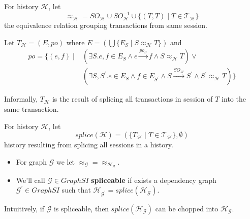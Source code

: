 \documentclass{beamer}
\begin{document}
\begin{frame}
	\begin{definition}
		For history $\mathcal{H}$, let
		$$ \approx_\mathcal{H} = SO_\mathcal{H} \cup SO^{-1}_\mathcal{H} \cup \{ (T,T) \mid T \in \mathcal{T}_\mathcal{H}\}$$
		the equivalence relation grouping transactions from same session.
	\end{definition}
\end{frame}

\begin{frame}
	\begin{definition}
		Let $\boxed{T}_\mathcal{H} = (E, po)$ where 
		$ E = \left(\bigcup \{E_S \mid S \approx_\mathcal{H} T \} \right) $
		and
		$$
		\begin{aligned}
			po = \{ (e,f) \mid & \left( \exists S . e,f \in E_S \wedge e \xrightarrow{po_S} f \wedge S \approx_\mathcal{H} T \right) \vee \\ 
			                   & \left( \exists S, S^\prime . e\in E_S \wedge f \in E_{S^\prime} \wedge S \xrightarrow{SO_\mathcal{H}} S^\prime \wedge S^\prime \approx_\mathcal{H} T \right) \}
		\end{aligned}
		$$	
	\end{definition}
	Informally, $\boxed{T}_\mathcal{H}$ is the result of splicing all transactions in session of $T$ into the same transaction.
\end{frame}

\begin{frame}
	\begin{definition}
		For history $\mathcal{H}$, let 
		$$ splice(\mathcal{H})=\left( \{ \boxed{T}_\mathcal{H} \mid T \in \mathcal{T}_\mathcal{H} \}, \emptyset \right) $$
		history resulting from splicing all sessions in a history.
	\end{definition}
	\begin{itemize}
		\item For graph $\mathcal{G}$ we let $\approx_\mathcal{G} = \approx_{\mathcal{H}_\mathcal{G}}$.
		\item We'll call $\mathcal{G} \in GraphSI $ \textbf{spliceable} if exists a dependency graph $ \mathcal{G}^\prime \in GraphSI $ such that $ \mathcal{H}_{\mathcal{G}^\prime} = splice(\mathcal{H}_\mathcal{G})$.
	\end{itemize}
	Intuitively, if $\mathcal{G}$ is spliceable, then $splice(\mathcal{H}_\mathcal{G})$ can be chopped into $\mathcal{H}_\mathcal{G}$.
\end{frame}
\end{document}

